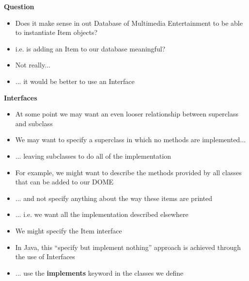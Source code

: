\documentclass{beamer}
\begin{document}
\begin{frame}
\begin{center}
\textbf{Question}
\end{center} 
\begin{itemize}
\item Does it make sense in out Database of Multimedia Entertainment to be able to instantiate Item objects?
\item i.e. is adding an Item to our database meaningful?
\bigskip
\item Not really...
\item ... it would be better to use an Interface
\end{itemize}
\end{frame}

\begin{frame}
\begin{center}
\textbf{Interfaces}
\end{center}
\end{frame}


\begin{frame}
\begin{itemize}
\item At some point we may want an even looser relationship between superclass and subclass
\item We may want to specify a superclass in which no methods are implemented...
\item ... leaving subclasses to do all of the implementation
\end{itemize}
\end{frame}

\begin{frame}
\begin{itemize}
\item For example, we might want to describe the methods provided by all classes that can be added to our DOME
\item ... and not specify anything about the way these items are printed
\item ... i.e. we want all the implementation described elsewhere
\bigskip
\item We might specify the Item interface
\end{itemize}
\end{frame}

\begin{frame}
\begin{itemize}
\item In Java, this ``specify but implement nothing'' approach is achieved through the use of Interfaces
\item ... use the \textbf{implements} keyword in the classes we define
\end{itemize}
\end{frame}
\end{document}
